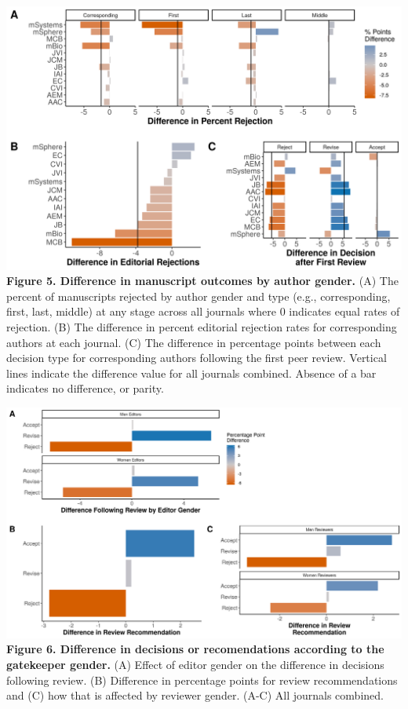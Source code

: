 \documentclass[11pt,]{article}
\begin{document}
\includegraphics{Figure_5.png} \textbf{Figure 5. Difference in
manuscript outcomes by author gender.} (A) The percent of manuscripts
rejected by author gender and type (e.g., corresponding, first, last,
middle) at any stage across all journals where 0 indicates equal rates
of rejection. (B) The difference in percent editorial rejection rates
for corresponding authors at each journal. (C) The difference in
percentage points between each decision type for corresponding authors
following the first peer review. Vertical lines indicate the difference
value for all journals combined. Absence of a bar indicates no
difference, or parity.

\newpage

\includegraphics{Figure_6.png} \textbf{Figure 6. Difference in decisions
or recomendations according to the gatekeeper gender.} (A) Effect of
editor gender on the difference in decisions following review. (B)
Difference in percentage points for review recommendations and (C) how
that is affected by reviewer gender. (A-C) All journals combined.
\end{document}
